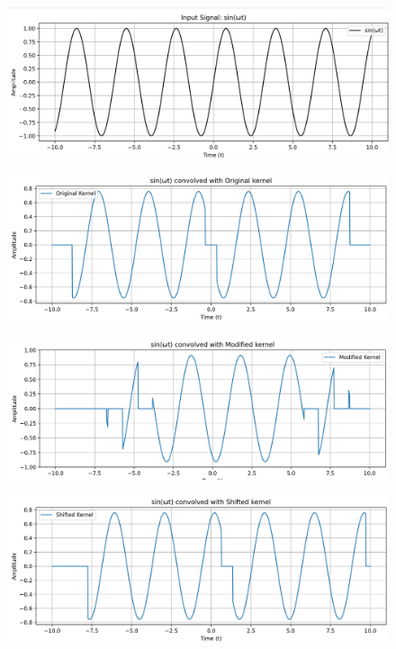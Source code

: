 \begin{figure}[H]
    \centering
    \includegraphics[width=\linewidth]{figs/sinwt.png}
\end{figure}
\begin{figure}[H]
    \centering
    \includegraphics[width=\linewidth]{figs/sinconv.png}
\end{figure}
\newpage
\begin{figure}[H]
    \centering
    \includegraphics[width=\linewidth]{figs/modifiedsin.png}
\end{figure}
\begin{figure}[H]
    \centering
    \includegraphics[width=\linewidth]{figs/shiftedsin.png}
\end{figure}

